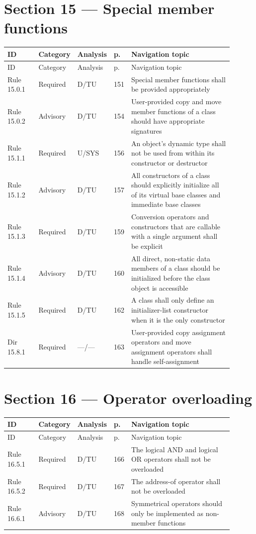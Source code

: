\documentclass[10pt,letterpaper]{article}
\begin{document}
\section{Section 15 --- Special member functions}
\small\setlength{\tabcolsep}{3pt}\renewcommand{\arraystretch}{1.15}
\begin{longtable}{p{0.14\linewidth}p{0.14\linewidth}p{0.1\linewidth}p{0.045\linewidth}p{0.475\linewidth}}
\toprule
ID & Category & Analysis & p. & Navigation topic\\ \midrule
\endfirsthead
\toprule
ID & Category & Analysis & p. & Navigation topic\\ \midrule
\endhead
Rule 15.0.1 & Required & D/TU & 151 & Special member functions shall be provided appropriately\\
Rule 15.0.2 & Advisory & D/TU & 154 & User-provided copy and move member functions of a class should have appropriate signatures\\
Rule 15.1.1 & Required & U/SYS & 156 & An object's dynamic type shall not be used from within its constructor or destructor\\
Rule 15.1.2 & Advisory & D/TU & 157 & All constructors of a class should explicitly initialize all of its virtual base classes and immediate base classes\\
Rule 15.1.3 & Required & D/TU & 159 & Conversion operators and constructors that are callable with a single argument shall be explicit\\
Rule 15.1.4 & Advisory & D/TU & 160 & All direct, non-static data members of a class should be initialized before the class object is accessible\\
Rule 15.1.5 & Required & D/TU & 162 & A class shall only define an initializer-list constructor when it is the only constructor\\
Dir 15.8.1 & Required & ---/--- & 163 & User-provided copy assignment operators and move assignment operators shall handle self-assignment\\
\bottomrule
\end{longtable}
\normalsize

\section{Section 16 --- Operator overloading}
\small\setlength{\tabcolsep}{3pt}\renewcommand{\arraystretch}{1.15}
\begin{longtable}{p{0.14\linewidth}p{0.14\linewidth}p{0.1\linewidth}p{0.045\linewidth}p{0.475\linewidth}}
\toprule
ID & Category & Analysis & p. & Navigation topic\\ \midrule
\endfirsthead
\toprule
ID & Category & Analysis & p. & Navigation topic\\ \midrule
\endhead
Rule 16.5.1 & Required & D/TU & 166 & The logical AND and logical OR operators shall not be overloaded\\
Rule 16.5.2 & Required & D/TU & 167 & The address-of operator shall not be overloaded\\
Rule 16.6.1 & Advisory & D/TU & 168 & Symmetrical operators should only be implemented as non-member functions\\
\bottomrule
\end{longtable}
\normalsize
\end{document}
